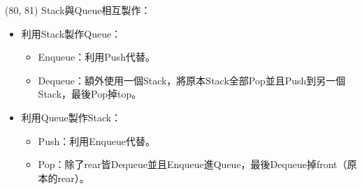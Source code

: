\item \begin{theorem}{(80, 81)} Stack與Queue相互製作：\begin{itemize}
        \item 利用Stack製作Queue：\begin{itemize}
            \item Enqueue：利用Push代替。
            \item Dequeue：額外使用一個Stack，將原本Stack全部Pop並且Push到另一個Stack，最後Pop掉top。
        \end{itemize}
        \item 利用Queue製作Stack：\begin{itemize}
            \item Push：利用Enqueue代替。
            \item Pop：除了rear皆Dequeue並且Enqueue進Queue，最後Dequeue掉front（原本的rear）。
        \end{itemize}
    \end{itemize}
\end{theorem}
